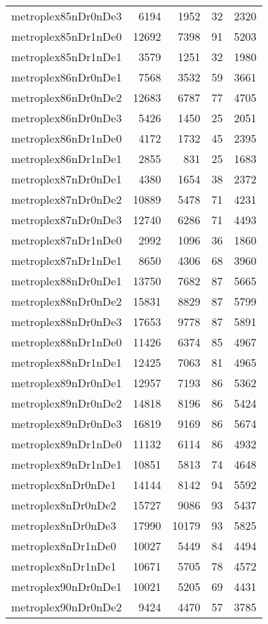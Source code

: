 \begin{longtable}{lrrrr}
metroplex85nDr0nDe3 & 6194 & 1952 & 32 & 2320 \\
metroplex85nDr1nDe0 & 12692 & 7398 & 91 & 5203 \\
metroplex85nDr1nDe1 & 3579 & 1251 & 32 & 1980 \\
metroplex86nDr0nDe1 & 7568 & 3532 & 59 & 3661 \\
metroplex86nDr0nDe2 & 12683 & 6787 & 77 & 4705 \\
metroplex86nDr0nDe3 & 5426 & 1450 & 25 & 2051 \\
metroplex86nDr1nDe0 & 4172 & 1732 & 45 & 2395 \\
metroplex86nDr1nDe1 & 2855 & 831 & 25 & 1683 \\
metroplex87nDr0nDe1 & 4380 & 1654 & 38 & 2372 \\
metroplex87nDr0nDe2 & 10889 & 5478 & 71 & 4231 \\
metroplex87nDr0nDe3 & 12740 & 6286 & 71 & 4493 \\
metroplex87nDr1nDe0 & 2992 & 1096 & 36 & 1860 \\
metroplex87nDr1nDe1 & 8650 & 4306 & 68 & 3960 \\
metroplex88nDr0nDe1 & 13750 & 7682 & 87 & 5665 \\
metroplex88nDr0nDe2 & 15831 & 8829 & 87 & 5799 \\
metroplex88nDr0nDe3 & 17653 & 9778 & 87 & 5891 \\
metroplex88nDr1nDe0 & 11426 & 6374 & 85 & 4967 \\
metroplex88nDr1nDe1 & 12425 & 7063 & 81 & 4965 \\
metroplex89nDr0nDe1 & 12957 & 7193 & 86 & 5362 \\
metroplex89nDr0nDe2 & 14818 & 8196 & 86 & 5424 \\
metroplex89nDr0nDe3 & 16819 & 9169 & 86 & 5674 \\
metroplex89nDr1nDe0 & 11132 & 6114 & 86 & 4932 \\
metroplex89nDr1nDe1 & 10851 & 5813 & 74 & 4648 \\
metroplex8nDr0nDe1 & 14144 & 8142 & 94 & 5592 \\
metroplex8nDr0nDe2 & 15727 & 9086 & 93 & 5437 \\
metroplex8nDr0nDe3 & 17990 & 10179 & 93 & 5825 \\
metroplex8nDr1nDe0 & 10027 & 5449 & 84 & 4494 \\
metroplex8nDr1nDe1 & 10671 & 5705 & 78 & 4572 \\
metroplex90nDr0nDe1 & 10021 & 5205 & 69 & 4431 \\
metroplex90nDr0nDe2 & 9424 & 4470 & 57 & 3785 \\

\end{longtable}
